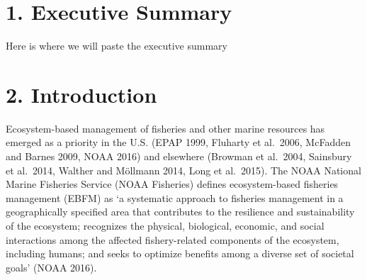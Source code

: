 \documentclass[
  letterpaper,
  oneside,
  open=any]{scrbook}
\renewcommand*\contentsname{Table of contents}
\newcommand\contentsname{Table of contents}
\begin{document}
\begin{frontmatter}
\begin{titlepage}
\begin{minipage}[b][\textheight][s]{\minipagewidth}
\authorblock

\affiliationblock

\vfill

\logoblock

\footerblock
\par

\end{minipage}
\clearpage
\restoregeometry
\end{titlepage}
\setcounter{page}{1}
\end{frontmatter}

\ifdefined\Shaded\renewenvironment{Shaded}{\begin{tcolorbox}[interior hidden, frame hidden, boxrule=0pt, borderline west={3pt}{0pt}{shadecolor}, breakable, sharp corners, enhanced]}{\end{tcolorbox}}\fi

\renewcommand*\contentsname{Table of contents}
{
\setcounter{tocdepth}{2}
\tableofcontents
}
\listoffigures
\listoftables
\mainmatter
{}

\hypertarget{executive-summary}{%
\chapter{1. Executive Summary}\label{executive-summary}}

Here is where we will paste the executive summary


\hypertarget{introduction}{%
\chapter{2. Introduction}\label{introduction}}

Ecosystem-based management of fisheries and other marine resources has
emerged as a priority in the U.S. (EPAP 1999, Fluharty et al.~2006,
McFadden and Barnes 2009, NOAA 2016) and elsewhere (Browman et al.~2004,
Sainsbury et al.~2014, Walther and Möllmann 2014, Long et al.~2015). The
NOAA National Marine Fisheries Service (NOAA Fisheries) defines
ecosystem-based fisheries management (EBFM) as `a systematic approach to
fisheries management in a geographically specified area that contributes
to the resilience and sustainability of the ecosystem; recognizes the
physical, biological, economic, and social interactions among the
affected fishery-related components of the ecosystem, including humans;
and seeks to optimize benefits among a diverse set of societal goals'
(NOAA 2016).
\end{document}
